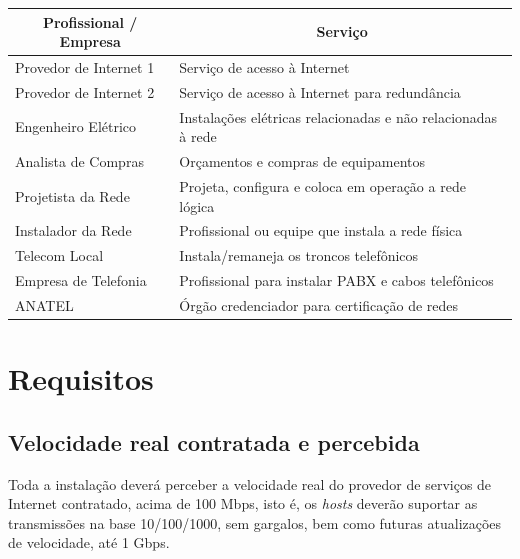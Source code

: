 \documentclass[	DIV=calc,%
							paper=a4,%
							fontsize=12pt,%
							onecolumn]{scrartcl}	 					%
\begin{document}
\begin{table}[H]
	\centering
	\renewcommand{\arraystretch}{2.0}
	\begin{tabular}{|l|l|}
		\hline
		\multicolumn{1}{|c|}{\textbf{Profissional / Empresa}} &	 \multicolumn{1}{|c|}{\textbf{Serviço}}                                 		  \\ \hline		Provedor de Internet 1                                
		& Serviço de acesso à Internet                                              \\ \hline
	    Provedor de Internet 2                               
	    & Serviço de acesso à Internet para redundância            					\\ \hline
		Engenheiro Elétrico                                  
		& Instalações elétricas relacionadas e não relacionadas à rede          \\ \hline
		Analista de Compras 
        & Orçamentos e compras de equipamentos          \\ \hline
		Projetista da Rede                                   
		& Projeta, configura e coloca em operação a rede lógica    \\ \hline
		Instalador da Rede                                   
		& Profissional ou equipe que instala a rede física           \\ \hline
		Telecom Local                                        
		& Instala/remaneja os troncos telefônicos         \\ \hline
		Empresa de Telefonia                                    
		& Profissional para instalar PABX e cabos telefônicos    \\ \hline
		ANATEL                                  
		& Órgão credenciador para certificação de redes \\ \hline
	\end{tabular}
\end{table}



\section{Requisitos}

\subsection{Velocidade real contratada e percebida}
Toda a instalação deverá perceber a velocidade real do provedor de serviços de Internet contratado, acima de 100 Mbps, isto é, os \textit{hosts} deverão suportar as transmissões na base 10/100/1000, sem gargalos, bem como futuras atualizações de velocidade, até 1 Gbps.
\end{document}
